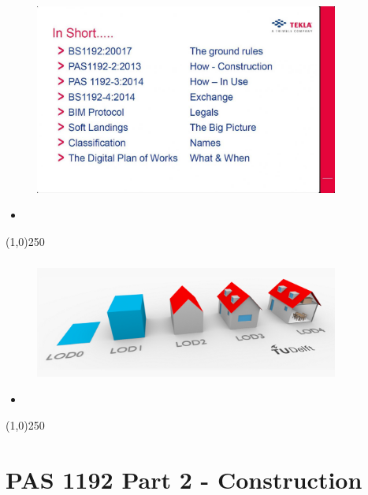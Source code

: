 \begin{frame}
\frametitle{}
\begin{figure}
	\centering
	\includegraphics[width=10cm]{./images/BIMsummary.jpg}
	\caption[]{}
	\label{fig:}
\end{figure}
\begin{itemize}
	\item 
\end{itemize}
\end{frame}
\begin{center}\line(1,0){250}\end{center}


\begin{frame}
\frametitle{}
\begin{figure}
	\centering
	\includegraphics[width=10cm]{./images/TUDelftLODfigure.png}
	\caption[]{}
	\label{fig:}
\end{figure}
\begin{itemize}
	\item 
\end{itemize}
\end{frame}
\begin{center}\line(1,0){250}\end{center}






\section{PAS 1192 Part 2 - Construction}

